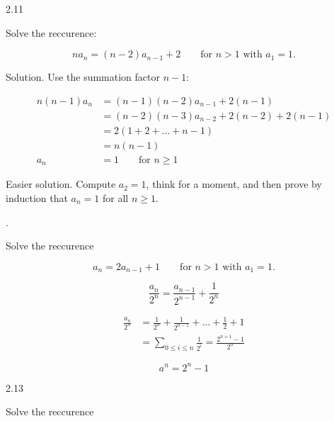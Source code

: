 \documentclass[12pt]{article}
\begin{document}
2.11

Solve the reccurence:

\begin{equation}
na_{n} = (n - 2)a_{n - 1} + 2  \qquad \text{for ${n > 1}$ with ${a_{1} = 1}$}. \nonumber
\end{equation}

Solution. Use the summation factor ${n - 1}$:

\begin{equation}
\begin{split}
n(n - 1)a_{n}   & = (n - 1)(n - 2)a_{n - 1} + 2(n - 1) \\
		& = (n - 2)(n - 3)a_{n-2} + 2(n - 2) + 2(n - 1) \\
		& = 2(1 + 2 + \dots + n - 1) \\
		& = n(n-1) \\
          a_{n} & = 1 \qquad \text{for ${n \geq 1}$}\nonumber
\end{split}
\end{equation}

Easier solution. Compute ${a_{2} = 1}$, think for a moment, and then prove
by induction that ${a_{n} = 1}$ for all ${n \geq 1}$.

.

Solve the reccurence

\begin{equation}
a_{n} = 2a_{n-1} + 1 \qquad \text{for ${n > 1}$ with ${a_{1} = 1}$.} \nonumber
\end{equation}

\begin{equation}
\frac{a_{n}}{2^n} = \frac{a_{n-1}}{2^{n-1}} + \frac{1}{2^n} \nonumber
\end{equation}

\begin{equation}
\begin{split}
\frac{a_{n}}{2^n} & = \frac{1}{2^n} + \frac{1}{2^{n-1}} + \dots + \frac{1}{2} + 1 \\
                  & = \sum_{0 \leq i \leq n}\frac{1}{2^i} = \frac{2^{n+1} - 1}{2^n}\nonumber
\end{split}
\end{equation}


\begin{equation}
a^n = 2^n - 1 \nonumber
\end{equation}

\bigskip

2.13

Solve the reccurence
\end{document}
